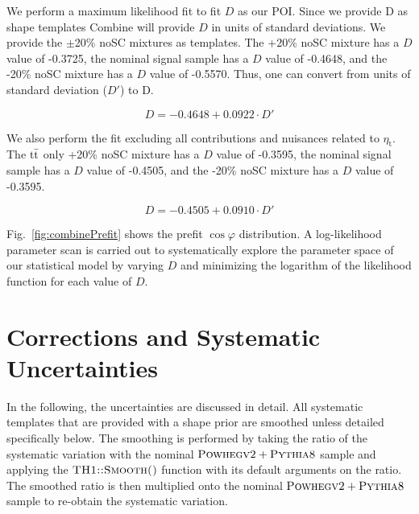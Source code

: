 We perform a maximum likelihood fit to fit $D$ as our POI. Since we provide D as shape templates Combine will provide $D$ in units of standard deviations. We provide the $\pm$20\% noSC mixtures as templates. The +20\% noSC mixture has a $D$ value of -0.3725, the nominal signal sample has a $D$ value of -0.4648, and the -20\% noSC mixture has a $D$ value of -0.5570. Thus, one can convert from units of standard deviation ($D'$) to D.

$$D=-0.4648+0.0922 \cdot D' $$

We also perform the fit excluding all contributions and nuisances related to $\eta_{\mathrm{t}}$. The $\mathrm{t\bar{t}}$ only +20\% noSC mixture has a $D$ value of -0.3595, the nominal signal sample has a $D$ value of -0.4505, and the -20\% noSC mixture has a $D$ value of -0.3595.

$$D=-0.4505+0.0910 \cdot D'$$

Fig.~\ref{fig:combinePrefit} shows the prefit $\cos \varphi$ distribution. A log-likelihood parameter scan is carried out to systematically explore the parameter space of our statistical model by varying $D$ and minimizing the logarithm of the likelihood function for each value of $D$.


\section{Corrections and Systematic Uncertainties}
In the following, the uncertainties are discussed in detail. All systematic templates that are provided with a shape prior are smoothed unless detailed specifically below. The smoothing is performed by taking the ratio of the systematic variation with the nominal ${\textsc{Powhegv2}} + {\textsc{Pythia8}}$ sample and applying the $\textsc{TH1::Smooth()}$ function with its default arguments on the ratio. The smoothed ratio is then multiplied onto the nominal ${\textsc{Powhegv2}} + {\textsc{Pythia8}}$ sample to re-obtain the systematic variation.

